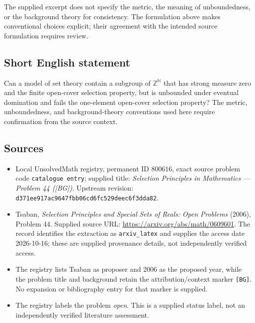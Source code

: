 \documentclass[11pt]{article}
\newcommand{\N}{\mathbb{N}}
\newcommand{\Z}{\mathbb{Z}}
\begin{document}
The supplied excerpt does not specify the metric, the meaning of unboundedness, or the background theory for consistency. The formulation above makes conventional choices explicit; their agreement with the intended source formulation requires review.
\subsection{Short English statement}
Can a model of set theory contain a subgroup of \(\Z^{\N}\) that has strong measure zero and the finite open-cover selection property, but is unbounded under eventual domination and fails the one-element open-cover selection property? The metric, unboundedness, and background-theory conventions used here require confirmation from the source context.
\subsection{Sources}
\begin{itemize}
\item Local UnsolvedMath registry, permanent ID \(800616\), exact source problem code \texttt{catalogue entry}; supplied title: \emph{Selection Principles in Mathematics --- Problem 44 ([BG])}. Upstream revision: \texttt{d371ee917ac9647fbb06cd6fc529deec6f3dda82}.
\item Tsaban, \emph{Selection Principles and Special Sets of Reals: Open Problems} (2006), Problem 44. Supplied source URL: \url{https://arxiv.org/abs/math/0609601}. The record identifies the extraction as \texttt{arxiv\_latex} and supplies the access date 2026-10-16; these are supplied provenance details, not independently verified access.
\item The registry lists Tsaban as proposer and 2006 as the proposed year, while the problem title and background retain the attribution/context marker \texttt{[BG]}. No expansion or bibliography entry for that marker is supplied.
\item The registry labels the problem \emph{open}. This is a supplied status label, not an independently verified literature assessment.
\end{itemize}
\end{document}
